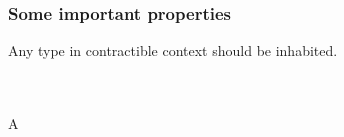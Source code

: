 \documentclass[12pt, mathserif,handout]{beamer}
\begin{document}
\begin{frame}

\frametitle{Some important properties}

Any type in contractible context should be inhabited.

\small
\begin{code}\>\<%
\\
\> \AgdaSymbol{:} \AgdaSymbol{\}}  \AgdaSymbol{\{} \AgdaSymbol{:}  \AgdaSymbol{\}}      \AgdaSymbol{\{}\AgdaSymbol{\}} \<%
\\
\> \AgdaSymbol{\{}A \AgdaSymbol{=} \AgdaSymbol{\}}  \AgdaSymbol{=}   \AgdaSymbol{(} \AgdaSymbol{\_)} \<[42]%
\>[42]   \AgdaSymbol{(} \AgdaSymbol{\_)} \<%
\\
\>\<\end{code}


\end{frame}
\end{document}
